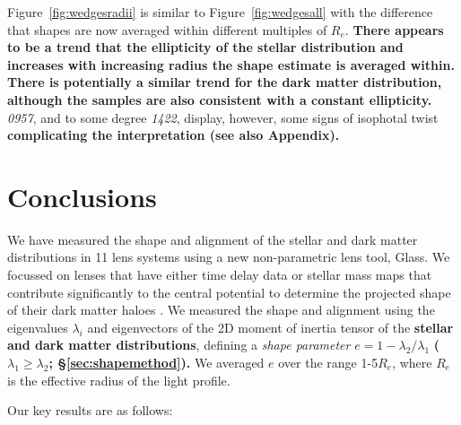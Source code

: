 \documentclass[useAMS,usenatbib]{mn2e}
\def\Glass{{\sc Glass}}
\newcommand{\cb}[1]{{\color{red} \textbf{#1}}}
\begin{document}
Figure~\ref{fig:wedgesradii} is similar to Figure~\ref{fig:wedgesall} with the difference that shapes are now averaged within different multiples of $R_e$. \cb{There appears to be a trend that the ellipticity of the stellar distribution and increases with increasing radius the shape estimate is averaged within. There is potentially a similar trend for the dark matter distribution, although the samples are also consistent with a constant ellipticity.} {\it0957}, and to some degree {\it1422}, display, however, some signs of isophotal twist \cb{complicating the interpretation (see also Appendix).}


\section{Conclusions}\label{sec:conclusions}
We have measured the shape and alignment of the stellar and dark matter distributions in 11 lens systems using a new non-parametric lens tool, \Glass. We focussed on lenses that have either time delay data or stellar mass maps that contribute significantly to the central potential to determine the projected shape of their dark matter haloes \citep{2014arXiv1401.7990C}. We measured the shape and alignment using the eigenvalues $\lambda_i$ and eigenvectors of the 2D moment of inertia tensor of the \cb{stellar and dark matter distributions}, defining a {\it shape parameter} $e = 1 - \lambda_{2}/\lambda_{1}$ \cb{($\lambda_{1} \geq \lambda_{2}$; \S\ref{sec:shapemethod}).} We averaged $e$ over the range 1-5$R_e$, where $R_e$ is the effective radius of the light profile.

Our key results are as follows:
\end{document}
